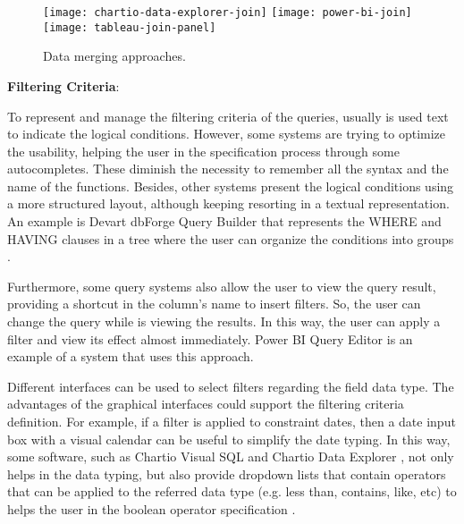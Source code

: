 \begin{figure}[htbp]
    \centering
      {\texttt{[image: chartio-data-explorer-join]}}%
    {\texttt{[image: power-bi-join]}}%
    \\
      {\texttt{[image: tableau-join-panel]}}%
  \caption{Data merging approaches.}
    \label{fig:approaches_select_data_sources}
\end{figure}

\bigskip

\textbf{Filtering Criteria}: 

To represent and manage the filtering criteria of the queries, usually is used text to indicate the logical conditions. However, some systems are trying to optimize the usability, helping the user in the specification process through some autocompletes. These diminish the necessity to remember all the syntax and the name of the functions. 
Besides, other systems present the logical conditions using a more structured layout, although keeping resorting in a textual representation. An example is Devart dbForge Query Builder \cite{dbForgeQueryBuilder} that represents the WHERE and HAVING clauses in a tree where the user can organize the conditions into groups \cite{dbForgeBuildingWhereOrHavingClause}.

Furthermore, some query systems also allow the user to view the query result, providing a shortcut in the column's name to insert filters. So, the user can change the query while is viewing the results. In this way, the user can apply a filter and view its effect almost immediately. Power BI Query Editor \cite{powerBI} is an example of a system that uses this approach.

Different interfaces can be used to select filters regarding the field data type. The advantages of the graphical interfaces could support the filtering criteria definition. For example, if a filter is applied to constraint dates, then a date input box with a visual calendar can be useful to simplify the date typing. In this way, some software, such as Chartio Visual SQL \cite{chartioVisualSQL} and Chartio Data Explorer \cite{chartioDataExplorer}, not only helps in the data typing, but also provide dropdown lists that contain operators that can be applied to the referred data type (e.g. less than, contains, like, etc)  to helps the user in the boolean operator specification \cite{chartioDataExplorer}  \cite{visualSqlActions}.

